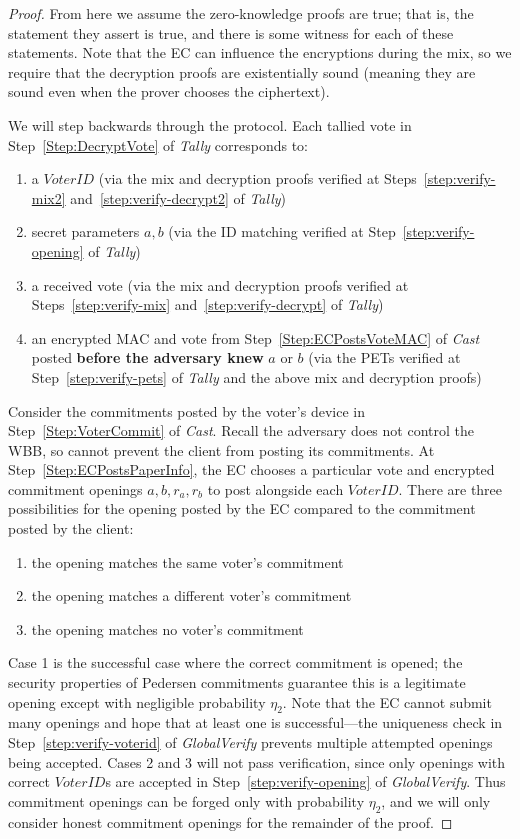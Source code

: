 \documentclass[12pt,a4paper]{article}
\theoremstyle{definition}
\newcommand{\VoterID}{\mathit{VoterID}}
\begin{document}
\begin{proof}
    From here we assume the zero-knowledge proofs are true; that is, the statement they assert is true, and there is some witness for each of these statements. Note that the EC can influence the encryptions during the mix, so we require that the decryption proofs are existentially sound (meaning they are sound even when the prover chooses the ciphertext).

    We will step backwards through the protocol. Each tallied vote in Step~\ref{Step:DecryptVote} of \textit{Tally} corresponds to:
    \begin{enumerate}
        \item a $\VoterID$ (via the mix and decryption proofs verified at Steps~\ref{step:verify-mix2} and~\ref{step:verify-decrypt2} of \textit{Tally})
        \item secret parameters $a, b$ (via the ID matching verified at Step~\ref{step:verify-opening} of \textit{Tally})
        \item a received vote (via the mix and decryption proofs verified at Steps~\ref{step:verify-mix} and~\ref{step:verify-decrypt} of \textit{Tally})
        \item an encrypted MAC and vote from Step~\ref{Step:ECPostsVoteMAC} of \textit{Cast} posted \textbf{before the adversary knew} $a$ or $b$ (via the PETs verified at Step~\ref{step:verify-pets} of \textit{Tally} and the above mix and decryption proofs)
    \end{enumerate}

    Consider the commitments posted by the voter's device in Step~\ref{Step:VoterCommit} of \textit{Cast}. Recall the adversary does not control the WBB, so cannot prevent the client from posting its commitments. At Step~\ref{Step:ECPostsPaperInfo}, the EC chooses a particular vote and encrypted commitment openings $a, b, r_a, r_b$ to post alongside each $\VoterID$. There are three possibilities for the opening posted by the EC compared to the commitment posted by the client:

    \begin{enumerate}
        \item the opening matches the same voter's commitment
        \item the opening matches a different voter's commitment
        \item the opening matches no voter's commitment
    \end{enumerate}

    Case 1 is the successful case where the correct commitment is opened; the security properties of Pedersen commitments guarantee this is a legitimate opening except with negligible probability $\eta_2$. Note that the EC cannot submit many openings and hope that at least one is successful---the uniqueness check in Step~\ref{step:verify-voterid} of \textit{GlobalVerify} prevents multiple attempted openings being accepted. Cases 2 and 3 will not pass verification, since only openings with correct $\VoterID$s are accepted in Step~\ref{step:verify-opening} of \textit{GlobalVerify}. Thus commitment openings can be forged only with probability $\eta_2$, and we will only consider honest commitment openings for the remainder of the proof.


\end{proof}
\end{document}
